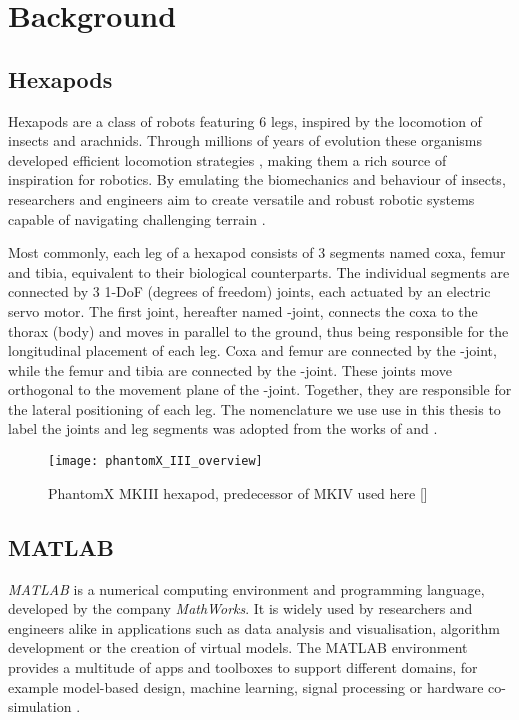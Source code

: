 \chapter{Background}
\label{ch:background}

\section{Hexapods} \label{sec: Hexapods}
Hexapods are a class of robots featuring 6 legs, inspired by the locomotion of insects and arachnids.
Through millions of years of evolution these organisms developed efficient locomotion strategies \parencite{neville2006bipedal}, making them a rich source of inspiration for robotics.
By emulating the biomechanics and behaviour of insects, researchers and engineers aim to create versatile and robust robotic systems capable of navigating challenging terrain \parencite{irawan2011optimal, ouyang2021adaptive, schilling2013walknet}.

Most commonly, each leg of a hexapod consists of 3 segments named coxa, femur and tibia, equivalent to their biological counterparts.
The individual segments are connected by 3 1-DoF (degrees of freedom) joints, each actuated by an electric servo motor.
The first joint, hereafter named \textalpha-joint, connects the coxa to the thorax (body) and moves in parallel to the ground, thus being responsible for the longitudinal placement of each leg.
Coxa and femur are connected by the \textbeta-joint, while the femur and tibia are connected by the \textgamma-joint. 
These joints move orthogonal to the movement plane of the \textalpha-joint. Together, they are responsible for the lateral positioning of each leg.
The nomenclature we use use in this thesis to label the joints and leg segments was adopted from the works of \cite{schilling2013walknet} and \cite{HeterarchicalArchitectureSchilling}.
\begin{figure}[h]
	\centerline{\texttt{[image: phantomX\_III\_overview]}}
	\caption{PhantomX MKIII hexapod, predecessor of MKIV used here [\cite{PhantomX_MKIII}]}
	\label{figure: PhantomX MKIII}
\end{figure}



\section{MATLAB}
\textit{MATLAB\textsuperscript{\textregistered}} is a numerical computing environment and programming language, developed by the company \textit{MathWorks\textsuperscript{\textregistered}}.
It is widely used by researchers and engineers alike in applications such as data analysis and visualisation, algorithm development or the creation of virtual models.
The MATLAB environment provides a multitude of apps and toolboxes to support different domains, for example model-based design, machine learning, signal processing or hardware co-simulation \parencite{MATLAB}.

